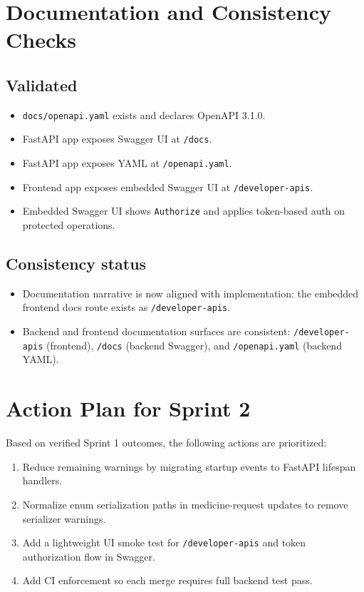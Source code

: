 \documentclass[11pt,a4paper]{article}
\newcommand{\apipath}[1]{\texttt{#1}}
\begin{document}
\section{Documentation and Consistency Checks}
\subsection{Validated}
\begin{itemize}[leftmargin=1.2cm]
  \item \apipath{docs/openapi.yaml} exists and declares OpenAPI 3.1.0.
  \item FastAPI app exposes Swagger UI at \apipath{/docs}.
  \item FastAPI app exposes YAML at \apipath{/openapi.yaml}.
  \item Frontend app exposes embedded Swagger UI at \apipath{/developer-apis}.
  \item Embedded Swagger UI shows \apipath{Authorize} and applies token-based auth on protected operations.
\end{itemize}

\subsection{Consistency status}
\begin{itemize}[leftmargin=1.2cm]
  \item Documentation narrative is now aligned with implementation: the embedded frontend docs route exists as \apipath{/developer-apis}.
  \item Backend and frontend documentation surfaces are consistent: \apipath{/developer-apis} (frontend), \apipath{/docs} (backend Swagger), and \apipath{/openapi.yaml} (backend YAML).
\end{itemize}

\section{Action Plan for Sprint 2}
Based on verified Sprint 1 outcomes, the following actions are prioritized:

\begin{enumerate}[leftmargin=1.2cm]
  \item Reduce remaining warnings by migrating startup events to FastAPI lifespan handlers.
  \item Normalize enum serialization paths in medicine-request updates to remove serializer warnings.
  \item Add a lightweight UI smoke test for \apipath{/developer-apis} and token authorization flow in Swagger.
  \item Add CI enforcement so each merge requires full backend test pass.
\end{enumerate}
\end{document}
